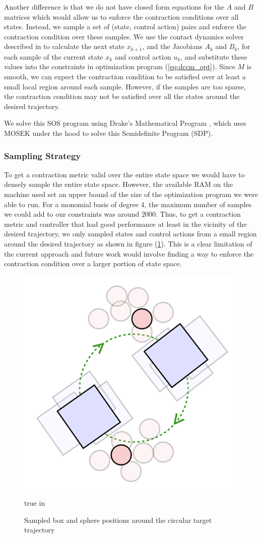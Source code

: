 \documentclass[journal]{IEEEtran}
\begin{document}
Another difference is that we do not have closed form equations for the $A$ and $B$ matrices which would allow us to enforce the contraction conditions over all states. Instead, we sample a set of (state, control action) pairs and enforce the contraction condition over these samples. We use the contact dynamics solver described in \autocite{pangGlobalPlanningContactRich2023} to calculate the next state $x_{k+1}$, and the Jacobians $A_k$ and $B_k$, for each sample of the current state $x_k$ and control action $u_k$, and substitute these values into the constraints in optimization program (\ref{eq:dccm_opt}). Since $M$ is smooth, we can expect the contraction condition to be satisfied over at least a small local region around each sample. However, if the samples are too sparse, the contraction condition may not be satisfied over all the states around the desired trajectory.

We solve this SOS program using Drake's Mathematical Program \autocite{DrakeModelBasedDesign}, which uses MOSEK under the hood to solve this Semidefinite Program (SDP).

\subsubsection{Sampling Strategy}
To get a contraction metric valid over the entire state space we would have to densely sample the entire state space. However, the available RAM on the machine used set an upper bound of the size of the optimization program we were able to run. For a monomial basis of degree $4$, the maximum number of samples we could add to our constraints was around $2000$. Thus, to get a contraction metric and controller that had good performance at least in the vicinity of the desired trajectory, we only sampled states and control actions from a small region around the desired trajectory as shown in figure (\ref{fig:sampling_strategy}). This is a clear limitation of the current approach and future work would involve finding a way to enforce the contraction condition over a larger portion of state space.

\begin{figure}[h]
	\centering\includegraphics[width = 0.3 \textwidth]
	{figures/sampling_strategy.png}
    \caption{Sampled box and sphere positions around the circular target trajectory}
	\label{fig:sampling_strategy}
	 true in
\end{figure}
\end{document}
